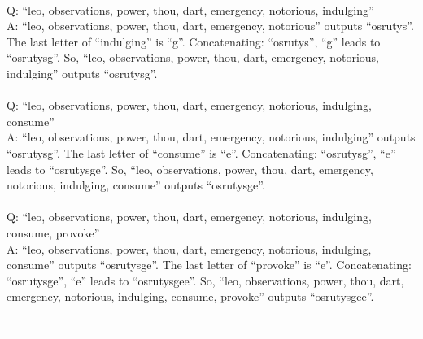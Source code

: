 {\\
Q: ``leo, observations, power, thou, dart, emergency, notorious, indulging'' \\
A: ``leo, observations, power, thou, dart, emergency, notorious'' outputs ``osrutys''. The last letter of ``indulging'' is ``g''. Concatenating: ``osrutys'', ``g'' leads to ``osrutysg''. So, ``leo, observations, power, thou, dart, emergency, notorious, indulging'' outputs ``osrutysg''. \\
\\
Q: ``leo, observations, power, thou, dart, emergency, notorious, indulging, consume'' \\
A: ``leo, observations, power, thou, dart, emergency, notorious, indulging'' outputs ``osrutysg''. The last letter of ``consume'' is ``e''. Concatenating: ``osrutysg'', ``e'' leads to ``osrutysge''. So, ``leo, observations, power, thou, dart, emergency, notorious, indulging, consume'' outputs ``osrutysge''. \\
\\
Q: ``leo, observations, power, thou, dart, emergency, notorious, indulging, consume, provoke'' \\
A: ``leo, observations, power, thou, dart, emergency, notorious, indulging, consume'' outputs ``osrutysge''. The last letter of ``provoke'' is ``e''. Concatenating: ``osrutysge'', ``e'' leads to ``osrutysgee''. So, ``leo, observations, power, thou, dart, emergency, notorious, indulging, consume, provoke'' outputs ``osrutysgee''. \\
\\
\hrule \bigskip
}


